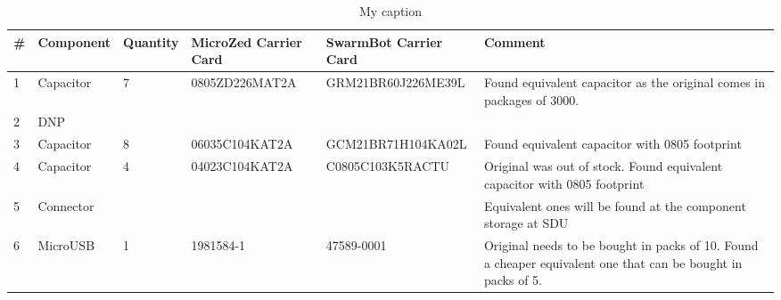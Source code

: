 \begin{table}

\centering
\caption{My caption}
\label{my-label}
\begin{tabular}{|p{0.5cm}|p{2cm}|p{1.5cm}|l|l|p{5cm}|}
\hline
\#      & Component              & Quantity & MicroZed Carrier Card & SwarmBot Carrier Card & Comment                                                                                                                                                                                                      \\ \hline
1       & Capacitor              & 7        & 0805ZD226MAT2A        & GRM21BR60J226ME39L    & Found equivalent capacitor as the original comes in packages of 3000.                                                                                                                                        \\ \hline
2       & DNP                    &          &                       &                       &                                                                                                                                                                                                              \\ \hline
3       & Capacitor              & 8        & 06035C104KAT2A        & GCM21BR71H104KA02L    & Found equivalent capacitor with 0805 footprint                                                                                                                                                               \\ \hline
4       & Capacitor              & 4        & 04023C104KAT2A        & C0805C103K5RACTU      & Original was out of stock. Found equivalent capacitor with 0805 footprint                                                                                                                                    \\ \hline
5       & Connector              &          &                       &                       & Equivalent ones will be found at the component storage at SDU                                                                                                                                                \\ \hline
6       & MicroUSB               & 1        & 1981584-1             & 47589-0001            & Original needs to be bought in packs of 10. Found a cheaper equivalent one that can be bought in packs of 5.                                                                                                 \\ \hline

\end{tabular}
\end{table}
